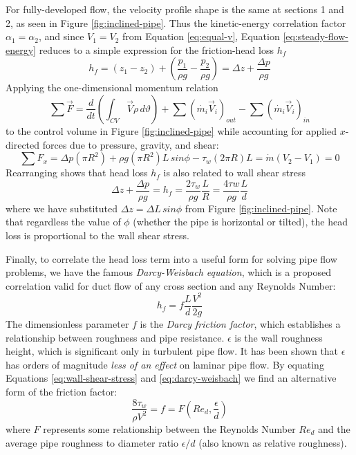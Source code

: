 \documentclass[11pt]{article} %
\numberwithin{equation}{section} %
\begin{document}
For fully-developed flow, the velocity profile shape is the same at sections 1 and 2, as seen in Figure \ref{fig:inclined-pipe}. Thus the kinetic-energy correlation factor $\alpha_{1} = \alpha_{2}$, and since $V_{1} = V_{2}$ from Equation \ref{eq:equal-v}, Equation \ref{eq:steady-flow-energy} reduces to a simple expression for the friction-head loss $h_{f}$ \cite{fluid-mechanics}
\begin{equation}
h_{f} = (z_{1} - z_{2}) + \left( \frac{p_{1}}{\rho g} - \frac{p_{2}}{\rho g} \right) = \Delta z + \frac{\Delta p}{\rho g}
\end{equation}
Applying the one-dimensional momentum relation
\begin{equation}
\sum \vec{F} = \frac{d}{dt} \left( \int_{CV} \vec{V} \rho\, d\vartheta \right) + \sum (\dot{m_{i}} \vec{V}_{i})_{out} - \sum (\dot{m_{i}} \vec{V}_{i})_{in}
\end{equation}
to the control volume in Figure \ref{fig:inclined-pipe} while accounting for applied $x$-directed forces due to pressure, gravity, and shear:
\begin{equation}
\sum F_{x} = \Delta p (\pi R^{2}) + \rho g (\pi R^{2}) L\, sin \phi - \tau_{w}(2 \pi R)L = \dot{m} (V_{2} - V_{1}) = 0
\end{equation}
Rearranging shows that head loss $h_{f}$ is also related to wall shear stress
\begin{equation} \label{eq:wall-shear-stress}
\Delta z + \frac{\Delta p}{\rho g} = h_{f} = \frac{2 \tau_{w}}{\rho g} \frac{L}{R} = \frac{4 \tau{w}}{\rho g} \frac{L}{d}
\end{equation}
where we have substituted $\Delta z = \Delta L\, sin \phi$ from Figure \ref{fig:inclined-pipe}. Note that regardless the value of $\phi$ (whether the pipe is horizontal or tilted), the head loss is proportional to the wall shear stress.

Finally, to correlate the head loss term into a useful form for solving pipe flow problems, we have the famous \textit{Darcy-Weisbach equation}, which is a proposed correlation valid for duct flow of any cross section and any Reynolds Number:
\begin{equation} \label{eq:darcy-weisbach}
h_{f} = f{\frac{L}{d}}{\frac{V^{2}}{2{g}}}
\end{equation}
The dimensionless parameter $f$ is the \textit{Darcy friction factor}, which establishes a relationship between roughness and pipe resistance. $\epsilon$ is the wall roughness height, which is significant only in turbulent pipe flow. It has been shown that $\epsilon$ has orders of magnitude \textit{less of an effect} on laminar pipe flow. By equating Equations \ref{eq:wall-shear-stress} and \ref{eq:darcy-weisbach} we find an alternative form of the friction factor:
\begin{equation} \label{eq:darcy-friction}
\frac{8 \tau_{w}}{\rho V^{2}} = f = F(Re_{d}, \frac{\epsilon}{d})
\end{equation}
where $F$ represents some relationship between the Reynolds Number $Re_{d}$ and the average pipe roughness to diameter ratio $\epsilon / d$ (also known as relative roughness).
\end{document}
